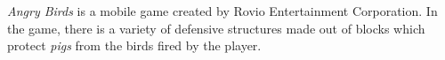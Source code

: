 \documentclass[sigconf]{acmart}
\begin{document}
\textit{Angry Birds} is a mobile game created by Rovio 
Entertainment 
Corporation. %
In the game, there is a variety of defensive structures made out of
blocks which protect {\em pigs} 
from the birds fired by the player. %
\end{document}
